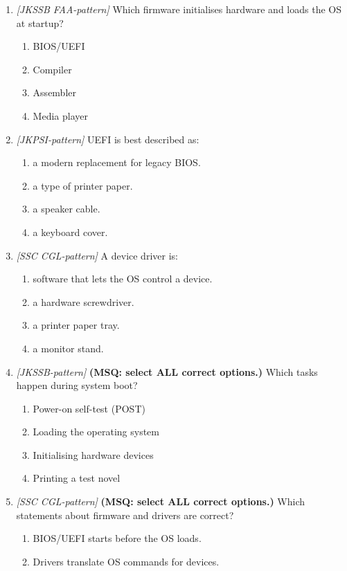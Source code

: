 \begin{enumerate}[label=\textbf{Q\arabic*.}, leftmargin=*]
\item \textit{[JKSSB FAA-pattern]} Which firmware initialises hardware and loads the OS at startup?
  \begin{enumerate}[label=\Alph*.]
    \item BIOS/UEFI
    \item Compiler
    \item Assembler
    \item Media player
  \end{enumerate}
\item \textit{[JKPSI-pattern]} UEFI is best described as:
  \begin{enumerate}[label=\Alph*.]
    \item a modern replacement for legacy BIOS.
    \item a type of printer paper.
    \item a speaker cable.
    \item a keyboard cover.
  \end{enumerate}
\item \textit{[SSC CGL-pattern]} A device driver is:
  \begin{enumerate}[label=\Alph*.]
    \item software that lets the OS control a device.
    \item a hardware screwdriver.
    \item a printer paper tray.
    \item a monitor stand.
  \end{enumerate}
\item \textit{[JKSSB-pattern]} \textbf{(MSQ: select ALL correct options.)} Which tasks happen during system boot?
  \begin{enumerate}[label=\Alph*.]
    \item Power-on self-test (POST)
    \item Loading the operating system
    \item Initialising hardware devices
    \item Printing a test novel
  \end{enumerate}
\item \textit{[SSC CGL-pattern]} \textbf{(MSQ: select ALL correct options.)} Which statements about firmware and drivers are correct?
  \begin{enumerate}[label=\Alph*.]
    \item BIOS/UEFI starts before the OS loads.
    \item Drivers translate OS commands for devices.

\end{enumerate}
\end{enumerate}
